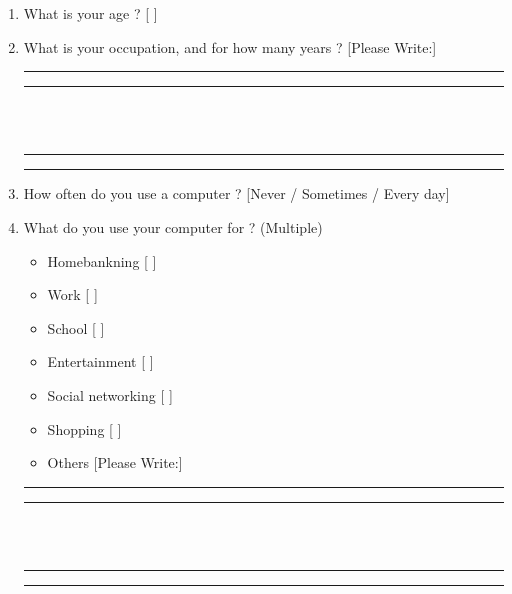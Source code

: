 \documentclass[11pt]{article}
\begin{document}
\begin{enumerate}
    \item What is your age ?                                        [        ]
    \item What is your occupation, and for how many years ?         [Please Write:]

    \begin{left}
        \rule{0.5\textwidth}{.4pt}
    \end{left}
    \begin{left}
        \rule{0.5\textwidth}{.4pt}
    \end{left}\\\\
    \begin{left}
        \rule{0.5\textwidth}{.4pt}
    \end{left}
    \begin{left}
        \rule{0.5\textwidth}{.4pt}
    \end{left}

    \item How often do you use a computer ?                         [Never / Sometimes / Every day]
    \item What do you use your computer for ? (Multiple)
    \begin{itemize}
        \item Homebankning [ ]
        \item Work [ ]
        \item School [ ]
        \item Entertainment [ ]
        \item Social networking [ ]
        \item Shopping [ ]
        \item Others    [Please Write:]
    \end{itemize}
    
    \begin{left}
        \rule{0.5\textwidth}{.4pt}
    \end{left}
    \begin{left}
        \rule{0.5\textwidth}{.4pt}
    \end{left}\\\\
    \begin{left}
        \rule{0.5\textwidth}{.4pt}
    \end{left}
    \begin{left}
        \rule{0.5\textwidth}{.4pt}
    \end{left}
    

\end{enumerate}
\end{document}
